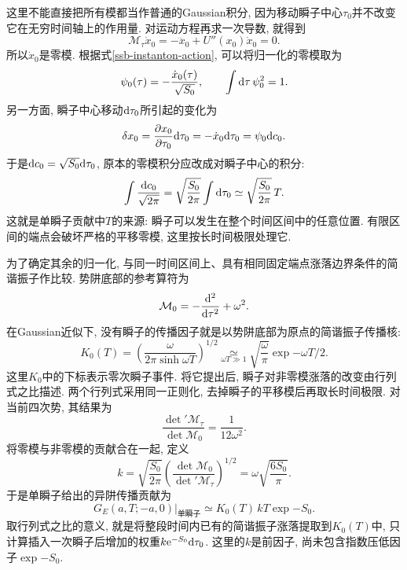 这里不能直接把所有模都当作普通的Gaussian积分, 因为移动瞬子中心$\tau_0$并不改变它在无穷时间轴上的作用量. 对运动方程再求一次导数, 就得到
\begin{equation}
    \mathcal M_\tau\dot x_0
    =-\dddot x_0+U''(x_0)\dot x_0=0.
\end{equation}
所以$\dot x_0$是零模. 根据式\eqref{ssb-instanton-action}, 可以将归一化的零模取为
\begin{equation}
    \psi_0(\tau)=-\frac{\dot x_0(\tau)}{\sqrt{S_0}},\qquad
    \int\mathrm d\tau\,\psi_0^2=1.
\end{equation}
另一方面, 瞬子中心移动$\mathrm d\tau_0$所引起的变化为
\begin{equation}
    \delta x_0=\frac{\partial x_0}{\partial\tau_0}\mathrm d\tau_0
    =-\dot x_0\mathrm d\tau_0=\psi_0\mathrm d c_0.
\end{equation}
于是$\mathrm d c_0=\sqrt{S_0}\mathrm d\tau_0$, 原本的零模积分应改成对瞬子中心的积分:
\begin{equation}\label{ssb-zero-mode-measure}
    \int\frac{\mathrm d c_0}{\sqrt{2\pi}}
    =\sqrt{\frac{S_0}{2\pi}}\int\mathrm d\tau_0
    \simeq\sqrt{\frac{S_0}{2\pi}}\,T.
\end{equation}
这就是单瞬子贡献中$T$的来源: 瞬子可以发生在整个时间区间中的任意位置. 有限区间的端点会破坏严格的平移零模, 这里按长时间极限处理它.

为了确定其余的归一化, 与同一时间区间上、具有相同固定端点涨落边界条件的简谐振子作比较. 势阱底部的参考算符为
\begin{equation}
    \mathcal M_0=-\frac{\mathrm d^2}{\mathrm d\tau^2}+\omega^2.
\end{equation}
在Gaussian近似下, 没有瞬子的传播因子就是以势阱底部为原点的简谐振子传播核:
\begin{equation}\label{ssb-no-instanton-kernel}
    K_0(T)=\left(\frac{\omega}{2\pi\sinh\omega T}\right)^{1/2}
    \underset{\omega T\gg1}{\simeq}\sqrt{\frac\omega\pi}\exp{-\omega T/2}.
\end{equation}
这里$K_0$中的下标表示零次瞬子事件. 将它提出后, 瞬子对非零模涨落的改变由行列式之比描述. 两个行列式采用同一正则化, 去掉瞬子的平移模后再取长时间极限. 对当前四次势, 其结果为
\begin{equation}\label{ssb-determinant-ratio}
    \frac{\det'\mathcal M_\tau}{\det\mathcal M_0}
    =\frac{1}{12\omega^2}.
\end{equation}
将零模与非零模的贡献合在一起, 定义
\begin{equation}\label{ssb-instanton-prefactor}
    k=\sqrt{\frac{S_0}{2\pi}}
      \left(\frac{\det\mathcal M_0}{\det'\mathcal M_\tau}\right)^{1/2}
      =\omega\sqrt{\frac{6S_0}{\pi}}.
\end{equation}
于是单瞬子给出的异阱传播贡献为
\begin{equation}\label{ssb-one-instanton-kernel}
    G_E(a,T;-a,0)\big|_{\text{单瞬子}}
    \simeq K_0(T)\,kT\exp{-S_0}.
\end{equation}
取行列式之比的意义, 就是将整段时间内已有的简谐振子涨落提取到$K_0(T)$中, 只计算插入一次瞬子后增加的权重$k\mathrm e^{-S_0}\mathrm d\tau_0$. 这里的$k$是前因子, 尚未包含指数压低因子$\exp{-S_0}$.

